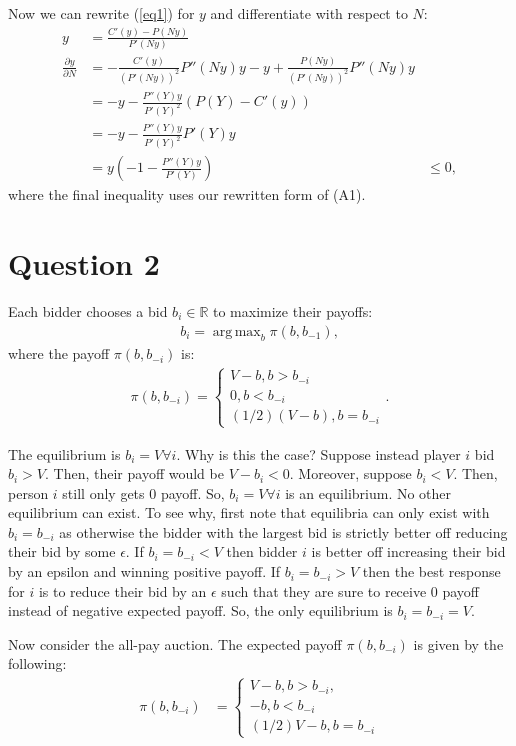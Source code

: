 \documentclass[11pt]{article} %
\DeclareMathOperator*{\argmax}{arg\,max}
\begin{document}
Now we can rewrite (\ref{eq1}) for $y$ and differentiate with respect to $N$:
\begin{align*}
y &= \frac{C'(y) - P(Ny)}{P'(Ny)}\\
\frac{\partial y}{\partial N} &= -\frac{C'(y)}{(P'(Ny))^2 }P''(Ny)y - y + \frac{P(Ny)}{(P'(Ny))^2}P''(Ny)y\\
&= -y - \frac{P''(Y)y}{P'(Y)^2}(P(Y) - C'(y)) \\
&= -y- \frac{P''(Y)y}{P'(Y)^2}P'(Y)y \\
&= y\left(-1 -\frac{P''(Y)y}{P'(Y)}\right)
&\leq 0,
\end{align*}
where the final inequality uses our rewritten form of (A1).

\section{Question 2}
Each bidder chooses a bid $b_i \in \mathbb{R}$ to maximize their payoffs:
\begin{align*}
b_i = \argmax_{b} \pi(b,b_{-1}),
\end{align*}
where the payoff $\pi(b,b_{-i})$ is:
\begin{align*}
\pi(b,b_{-i}) = \begin{cases} V - b, b>b_{-i} \\ 0, b<b_{-i}\\ (1/2)(V-b), b=b_{-i} \end{cases}.
\end{align*}

The equilibrium is $b_i = V \forall i$. Why is this the case? Suppose instead player $i$ bid $b_i>V$. Then, their payoff would be $V-b_i<0$. Moreover, suppose $b_i<V$. Then, person $i$ still only gets $0$ payoff. So, $b_i = V \forall i$ is an equilibrium. No other equilibrium can exist. To see why, first note that equilibria can only exist with $b_i = b_{-i}$ as otherwise the bidder with the largest bid is strictly better off reducing their bid by some $\epsilon$. If $b_i = b_{-i}<V$ then bidder $i$ is better off increasing their bid by an epsilon and winning positive payoff. If $b_i = b_{-i}>V$ then the best response for $i$ is to reduce their bid by an $\epsilon$ such that they are sure to receive $0$ payoff instead of negative expected payoff. So, the only equilibrium is $b_i= b_{-i} = V.$

Now consider the all-pay auction. The expected payoff $\pi(b,b_{-i})$ is given by the following:
\begin{align*}
\pi(b,b_{-i}) &= \begin{cases} V - b , b>b_{-i}, \\ -b, b<b_{-i} \\ (1/2)V - b, b=b_{-i}  \end{cases}
\end{align*}
\end{document}
